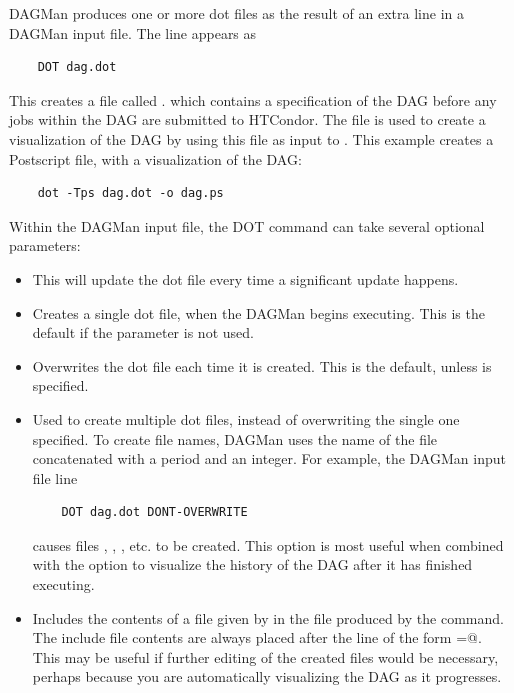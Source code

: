 DAGMan produces one or more dot files as the result of
an extra line
in a DAGMan input file. 
The line appears as
\begin{verbatim}
    DOT dag.dot
\end{verbatim}

This creates a file called .
which contains
a specification of the DAG before any jobs within the DAG
are submitted to HTCondor.
The  file is used to create a visualization
of the DAG by using this file as input to .
This example creates a Postscript file, with a visualization of the DAG:

\begin{verbatim}
    dot -Tps dag.dot -o dag.ps
\end{verbatim}

Within the DAGMan input file,
the DOT command can take several optional parameters:

\begin{itemize}

\item {}  This will update the dot file every time a
significant update happens. 

\item {} Creates a single dot file, when
the DAGMan begins executing. This is the default if the parameter
 is not used.

\item {} Overwrites the dot file each time it
is created. This is the default, unless 
is specified.

\item {} Used to create multiple dot files, instead
of overwriting the single one specified.
To create file names,
DAGMan uses the name of the file concatenated with a period and an
integer. For example, the DAGMan input file line
\begin{verbatim}
    DOT dag.dot DONT-OVERWRITE
\end{verbatim}
causes files
,
,
,
etc. to be created.
This option is
most useful when combined with the  option to
visualize the history of the DAG after it has finished executing. 

\item {} Includes the contents
of a file given by  in the file produced by the
 command.
The include file contents are always placed after the line of
the form
\verb@label=@.
This may be useful if further editing of the created files would
be necessary,
perhaps because you are automatically visualizing the DAG as it
progresses. 

\end{itemize}

